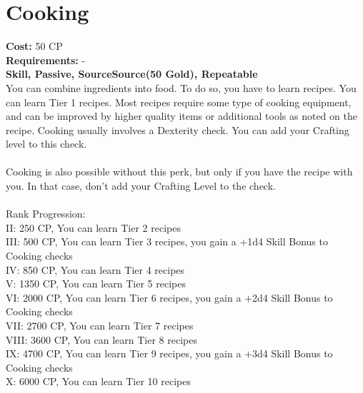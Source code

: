\section{Cooking}\label{perk:cooking}
\textbf{Cost:} 50 CP\\
\textbf{Requirements:} -\\
\textbf{Skill, Passive, SourceSource(50 Gold), Repeatable}\\
You can combine ingredients into food.
To do so, you have to learn recipes.
You can learn Tier 1 recipes.
Most recipes require some type of cooking equipment, and can be improved by higher quality items or additional tools as noted on the recipe.
Cooking usually involves a Dexterity check.
You can add your Crafting level to this check. \\
\\
Cooking is also possible without this perk, but only if you have the recipe with you.
In that case, don't add your Crafting Level to the check.\\
\\
Rank Progression:\\
II: 250 CP, You can learn Tier 2 recipes\\
III: 500 CP, You can learn Tier 3 recipes, you gain a +1d4 Skill Bonus to Cooking checks\\
IV: 850 CP, You can learn Tier 4 recipes\\
V: 1350 CP, You can learn Tier 5 recipes\\
VI: 2000 CP, You can learn Tier 6 recipes, you gain a +2d4 Skill Bonus to Cooking checks\\
VII: 2700 CP, You can learn Tier 7 recipes\\
VIII: 3600 CP, You can learn Tier 8 recipes\\
IX: 4700 CP, You can learn Tier 9 recipes, you gain a +3d4 Skill Bonus to Cooking checks\\
X: 6000 CP, You can learn Tier 10 recipes\\